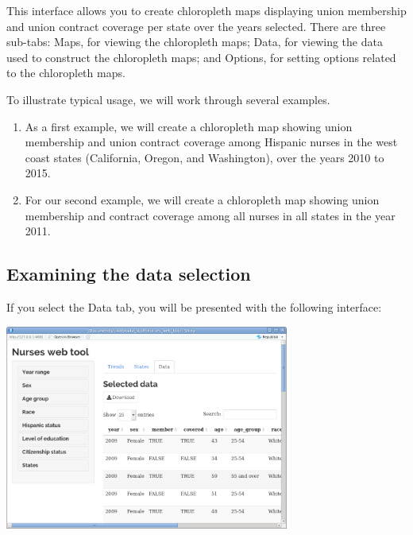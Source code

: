 \documentclass[letterpaper,12pt]{article}
\begin{document}
This interface allows you to create chloropleth maps displaying union
membership and union contract coverage per state over the years
selected. There are three sub-tabs: Maps, for viewing the chloropleth
maps; Data, for viewing the data used to construct the chloropleth
maps; and Options, for setting options related to the chloropleth
maps.

To illustrate typical usage, we will work through several examples.
\begin{enumerate}
\item As a first example, we will create a chloropleth map showing
  union membership and union contract coverage among Hispanic nurses
  in the west coast states (California, Oregon, and Washington), over
  the years 2010 to 2015.

\item For our second example, we will create a chloropleth map showing
  union membership and contract coverage among all nurses in all
  states in the year 2011.

\end{enumerate}

\subsection{Examining the data selection}

If you select the Data tab, you will be presented with the following
interface:

\begin{center}
  \includegraphics[width=0.7\textwidth]{images/data_interface.png}
\end{center}

\end{document}
